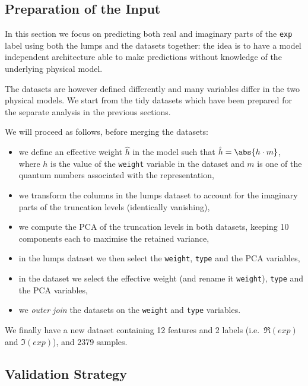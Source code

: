 \subsection{Preparation of the Input}

In this section we focus on predicting both real and imaginary parts of the \texttt{exp} label using both the lumps and the \wzw datasets together: the idea is to have a model independent architecture able to make predictions without knowledge of the underlying physical model.

The datasets are however defined differently and many variables differ in the two physical models.
We start from the tidy datasets which have been prepared for the separate analysis in the previous sections.

We will proceed as follows, before merging the datasets:
\begin{itemize}
  \item we define an effective weight $\hat{h}$ in the \wzw model such that $\hat{h} = \abs{h \cdot m}$, where $h$ is the value of the \texttt{weight} variable in the dataset and $m$ is one of the quantum numbers associated with the  representation,\footnotemark{}
  \item we transform the columns in the lumps dataset to account for the imaginary parts of the truncation levels (identically vanishing),
  \item we compute the PCA of the truncation levels in both datasets, keeping 10 components each to maximise the retained variance,
  \item in the lumps dataset we then select the \texttt{weight}, \texttt{type} and the PCA variables,
  \item in the \wzw dataset we select the effective weight (and rename it \texttt{weight}), \texttt{type} and the PCA variables,
  \item we \emph{outer join} the datasets on the \texttt{weight} and \texttt{type} variables.
\end{itemize}
We finally have a new dataset containing 12 features and 2 labels (i.e.\ $\Re(exp)$ and $\Im(exp)$), and 2379 samples.


\subsection{Validation Strategy}

